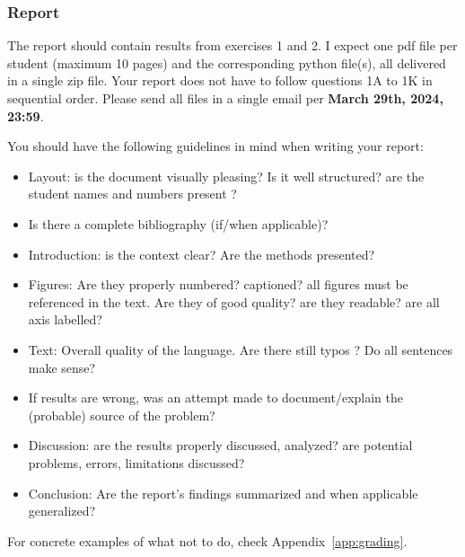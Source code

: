 \subsubsection*{Report}

The report should contain results from exercises 1 and 2. I expect one pdf file per student
(maximum 10 pages) and the corresponding python file(s), all delivered in a single zip file.
Your report does not have to follow questions 1A to 1K in sequential order. 
Please send all files in a single email per {\bf March 29th, 2024, 23:59}. 

You should have the following guidelines in mind when writing your report:
\begin{itemize}
\item Layout: is the document visually pleasing? Is it well structured? are the student names 
and numbers present ?
\item Is there a complete bibliography (if/when applicable)?
\item Introduction: is the context clear? Are the methods presented?
\item Figures: Are they properly numbered? captioned? all figures must be referenced in the text. 
Are they of good quality? are they readable? are all axis labelled?
\item Text: Overall quality of the language. Are there still typos ? Do all sentences make sense?
\item If results are wrong, was an attempt made to document/explain the (probable) source
of the problem?
\item Discussion: are the results properly discussed, analyzed? are potential problems, 
errors, limitations discussed?
\item Conclusion: Are the report's findings summarized and when applicable generalized?
\end{itemize}
For concrete examples of what not to do, check Appendix~\ref{app:grading}.



